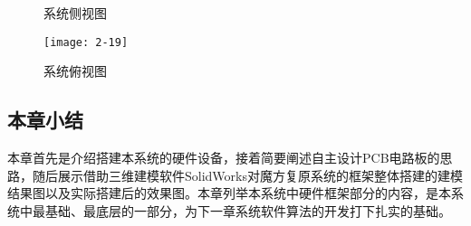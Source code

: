 \begin{figure}[H]
	\centering
	\subfigure{
		\texttt{[image: 2-18]}}
	\subfigure{
		\texttt{[image: 2-18.1]}}
	\caption{系统侧视图}\label{fig:2-18}
\end{figure}

\begin{figure}[H]
	\centering
	\texttt{[image: 2-19]}
	\caption{系统俯视图}\label{fig:2-19}
\end{figure}

\subsection{本章小结}

本章首先是介绍搭建本系统的硬件设备，接着简要阐述自主设计PCB电路板的思路，随后展示借助三维建模软件SolidWorks对魔方复原系统的框架整体搭建的建模结果图以及实际搭建后的效果图。本章列举本系统中硬件框架部分的内容，是本系统中最基础、最底层的一部分，为下一章系统软件算法的开发打下扎实的基础。